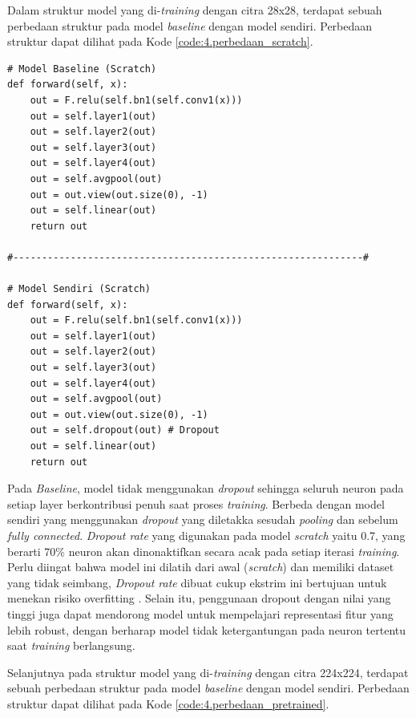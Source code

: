 Dalam struktur model yang di-\textit{training} dengan citra 28x28, 
terdapat sebuah perbedaan struktur pada model \textit{baseline} dengan 
model sendiri. Perbedaan struktur dapat dilihat pada Kode \ref{code:4.perbedaan_scratch}. \par

\begin{lstlisting}[caption={Perbedaan Model \textit{Scratch}}, label={code:4.perbedaan_scratch}]
# Model Baseline (Scratch)
def forward(self, x):
    out = F.relu(self.bn1(self.conv1(x)))
    out = self.layer1(out)
    out = self.layer2(out)
    out = self.layer3(out)
    out = self.layer4(out)
    out = self.avgpool(out)
    out = out.view(out.size(0), -1)
    out = self.linear(out)
    return out

#-------------------------------------------------------------#

# Model Sendiri (Scratch)
def forward(self, x):
    out = F.relu(self.bn1(self.conv1(x)))
    out = self.layer1(out)
    out = self.layer2(out)
    out = self.layer3(out)
    out = self.layer4(out)
    out = self.avgpool(out)
    out = out.view(out.size(0), -1)
    out = self.dropout(out) # Dropout
    out = self.linear(out)
    return out
\end{lstlisting}

Pada \textit{Baseline}, model tidak menggunakan \textit{dropout} sehingga 
seluruh neuron pada setiap layer berkontribusi penuh 
saat proses \textit{training}. Berbeda dengan model sendiri yang 
menggunakan \textit{dropout} yang diletakka sesudah \textit{pooling} dan 
sebelum \textit{fully connected}. \textit{Dropout rate} yang digunakan 
pada model \textit{scratch} yaitu 0.7, yang berarti 70\% neuron akan 
dinonaktifkan secara acak pada setiap iterasi \textit{training}. 
Perlu diingat bahwa model ini dilatih dari awal (\textit{scratch}) dan 
memiliki dataset yang tidak seimbang, \textit{Dropout rate} dibuat cukup 
ekstrim ini bertujuan untuk menekan risiko overfitting \cite{srivastava2014dropout}. 
Selain itu, penggunaan dropout dengan nilai yang tinggi juga dapat 
mendorong model untuk mempelajari representasi fitur yang lebih robust, 
dengan berharap model tidak ketergantungan pada neuron tertentu saat 
\textit{training} berlangsung. \par


Selanjutnya pada struktur model yang di-\textit{training} dengan citra 
224x224, terdapat sebuah perbedaan struktur pada model \textit{baseline} 
dengan model sendiri. Perbedaan struktur dapat dilihat pada Kode \ref{code:4.perbedaan_pretrained}. \par

